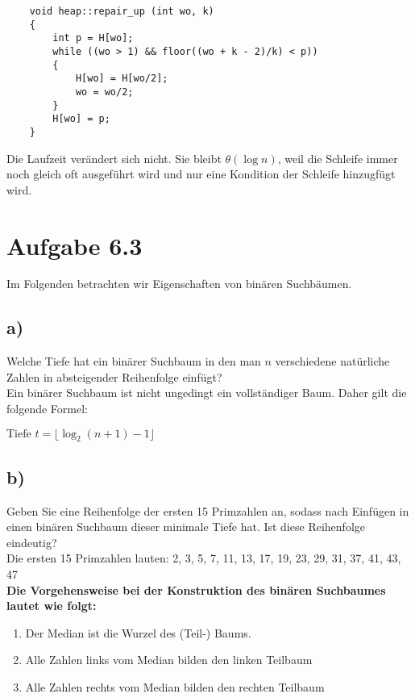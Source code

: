 \documentclass[a4paper]{article}
\begin{document}
\begin{verbatim}
    void heap::repair_up (int wo, k)
    {
        int p = H[wo];
        while ((wo > 1) && floor((wo + k - 2)/k) < p))
        {
            H[wo] = H[wo/2];
            wo = wo/2;
        }
        H[wo] = p;
    }
\end{verbatim}

Die Laufzeit verändert sich nicht. Sie bleibt $\theta(\log n)$, weil die Schleife immer noch gleich oft ausgeführt wird und nur eine Kondition der Schleife hinzugfügt wird.

\break

\section*{Aufgabe 6.3}
Im Folgenden betrachten wir Eigenschaften von binären Suchbäumen.

\subsection*{a)}
Welche Tiefe hat ein binärer Suchbaum in den man $n$ verschiedene natürliche Zahlen in absteigender Reihenfolge einfügt?\\

Ein binärer Suchbaum ist nicht ungedingt ein vollständiger Baum. Daher gilt die folgende Formel:

$\text{Tiefe } t = \lfloor \log_2(n + 1) - 1 \rfloor$

\subsection*{b)}
Geben Sie eine Reihenfolge der ersten 15 Primzahlen an, sodass nach Einfügen in einen binären Suchbaum dieser minimale Tiefe hat. Ist diese Reihenfolge eindeutig?\\

Die ersten 15 Primzahlen lauten: 2, 3, 5, 7, 11, 13, 17, 19, 23, 29, 31, 37, 41, 43, 47\\

\textbf{Die Vorgehensweise bei der Konstruktion des binären Suchbaumes lautet wie folgt:}

\begin{enumerate}
    \item Der Median ist die Wurzel des (Teil-) Baums.
    \item Alle Zahlen links vom Median bilden den linken Teilbaum
    \item Alle Zahlen rechts vom Median bilden den rechten Teilbaum\\
\end{enumerate}
\end{document}
